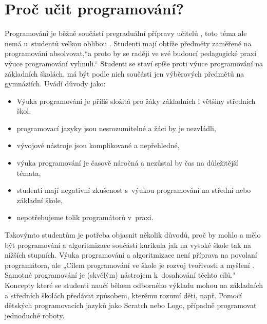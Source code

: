 \documentclass[FP,DP]{tulthesis}
\begin{document}
{{{{{{{\section{Proč učit programování?}

Programování je běžně součástí  pregraduální  přípravy učitelů \citep{berki2013}, toto téma ale nemá u~studentů velkou oblibou \citep{fojtik2015}. Studenti mají obtíže předměty zaměřené na programování absolvovat,“a proto by se raději ve své budoucí pedagogické praxi výuce programování vyhnuli.“ \citep[s.~54 ]{fojtik2015} Studenti se staví spíše proti výuce programování na základních školách, má být podle nich součásti jen výběrových předmětů na gymnáziích. Uvádí důvody jako:
\vspace{2mm}\begin{itemize}[nosep]
  	\item Výuka programování je příliš složitá pro žáky základních i většiny středních škol,
	\item programovací jazyky jsou nesrozumitelné a žáci by je nezvládli,
	\item vývojové nástroje jsou komplikované a nepřehledné,
	\item výuka programování je časově náročná a nezůstal by čas na důležitější témata,
	\item studenti mají negativní zkušenost s~výukou programování na střední nebo základní škole,
	\item nepotřebujeme tolik programátorů v~praxi.
\end{itemize}
\vspace{2mm}Takovýmto studentům je potřeba objasnit několik důvodů, proč by mohlo a mělo být programování a algoritmizace součástí kurikula jak na vysoké škole tak na nižších stupních.  \citep[s.~54 ]{fojtik2015}
Výuka programování a algoritmizace není příprava na povolaní programátora, ale „Cílem programování ve škole je rozvoj tvořivosti a myšlení . Samotné programování je (skvělým) nástrojem k~dosahování těchto cílů." \citep{lessner2015} Koncepty které se studenti naučí během odborného výkladu mohou na základních a středních školách předávat způsobem, kterému rozumí děti, např. Pomocí dětských programovacích jazyků jako Scratch nebo Logo, případně programovat jednoduché roboty.

}}}}}}}
\end{document}

